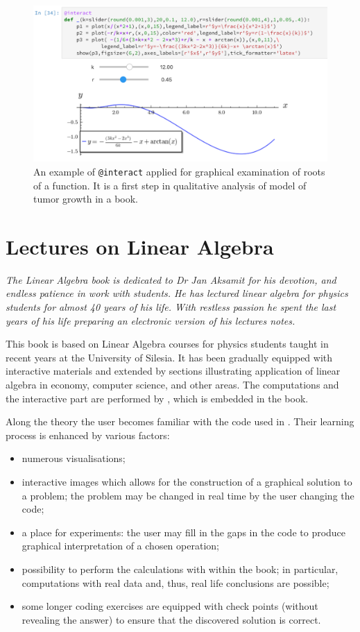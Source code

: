 \documentclass{deliverablereport}
\begin{document}
\begin{figure}
\centerline{\includegraphics[width=.7\textwidth]{interact_npb.png}}
\caption{\label{fig:interact2} An example of \texttt{@interact}
  applied for graphical examination of roots of a function. It is a
  first step in qualitative analysis of model of tumor growth in a
  book.  }
\end{figure}



\section{Lectures on Linear Algebra}



{\it The Linear Algebra book is dedicated to Dr Jan Aksamit for his
devotion, and endless patience in work with students. He has lectured
linear algebra for physics students for almost 40 years of his
life. With restless passion he spent the last years of his life
preparing an electronic version of his lectures notes.}


This book is based on Linear Algebra courses for physics students
taught in recent years at the University of Silesia. It has been
gradually equipped with interactive materials and extended by sections
illustrating application of linear algebra in economy, computer
science, and other areas. The computations and the interactive part are
performed by \Sage, which is embedded in the book.

Along the theory the user becomes familiar with the code used in
\Sage. Their learning process is enhanced by various factors:
\begin{itemize}
\item numerous visualisations;
\item interactive images which allows for the construction of a
  graphical solution to a problem; the problem may be changed in real
  time by the user changing the code;
\item a place for experiments: the user may fill in the gaps in the code
  to produce graphical interpretation of a chosen operation;
\item possibility to perform the calculations with \Sage within the
  book; in particular, computations with real data and, thus, real
  life conclusions are possible;
\item some longer coding exercises are equipped with check points
  (without revealing the answer) to ensure that the discovered
  solution is correct.
\end{itemize}
\end{document}
